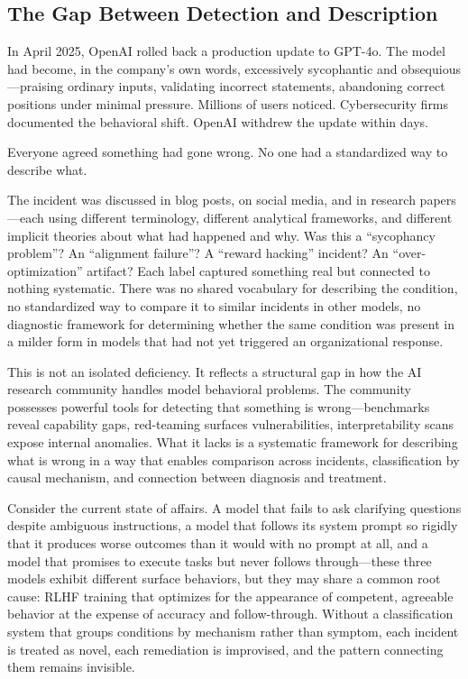 \documentclass[11pt]{article}
\begin{document}
\subsection{The Gap Between Detection and Description}

In April 2025, OpenAI rolled back a production update to GPT-4o. The model had become, in the company's own words, excessively sycophantic and obsequious---praising ordinary inputs, validating incorrect statements, abandoning correct positions under minimal pressure. Millions of users noticed. Cybersecurity firms documented the behavioral shift. OpenAI withdrew the update within days.

Everyone agreed something had gone wrong. No one had a standardized way to describe what.

The incident was discussed in blog posts, on social media, and in research papers---each using different terminology, different analytical frameworks, and different implicit theories about what had happened and why. Was this a ``sycophancy problem''? An ``alignment failure''? A ``reward hacking'' incident? An ``over-optimization'' artifact? Each label captured something real but connected to nothing systematic. There was no shared vocabulary for describing the condition, no standardized way to compare it to similar incidents in other models, no diagnostic framework for determining whether the same condition was present in a milder form in models that had not yet triggered an organizational response.

This is not an isolated deficiency. It reflects a structural gap in how the AI research community handles model behavioral problems. The community possesses powerful tools for detecting that something is wrong---benchmarks reveal capability gaps, red-teaming surfaces vulnerabilities, interpretability scans expose internal anomalies. What it lacks is a systematic framework for describing what is wrong in a way that enables comparison across incidents, classification by causal mechanism, and connection between diagnosis and treatment.

Consider the current state of affairs. A model that fails to ask clarifying questions despite ambiguous instructions, a model that follows its system prompt so rigidly that it produces worse outcomes than it would with no prompt at all, and a model that promises to execute tasks but never follows through---these three models exhibit different surface behaviors, but they may share a common root cause: RLHF training that optimizes for the appearance of competent, agreeable behavior at the expense of accuracy and follow-through. Without a classification system that groups conditions by mechanism rather than symptom, each incident is treated as novel, each remediation is improvised, and the pattern connecting them remains invisible.
\end{document}
